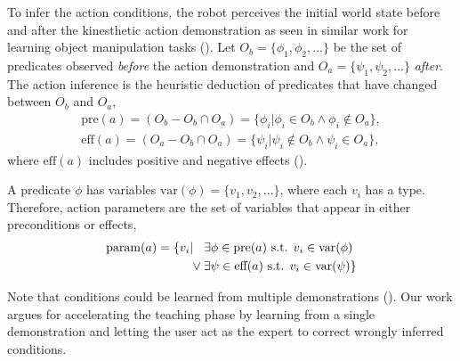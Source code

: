 To infer the action conditions, the robot perceives the initial world state   before %
and after the kinesthetic action demonstration as seen in similar work for learning object manipulation tasks (\cite{ahmadzadeh2015learning}).
Let $O_b = \{\phi_1, \phi_2, ... \}$ be the set of predicates observed \emph{before} the action demonstration and $O_a = \{\psi_1, \psi_2, ... \}$ \emph{after}.
The action inference is the heuristic deduction of predicates that have changed between $O_b$ and $O_a$, \ie
\begin{align*} \text{pre}(a) = (O_b - O_b \cap O_a) = \{\phi_i | \phi_i \in O_b \wedge \phi_i \notin O_a \}, \\
\text{eff}(a) = (O_a - O_b \cap O_a) = \{\psi_i | \psi_i \notin O_b \wedge \psi_i \in O_a \}, 
\end{align*}
where $\text{eff}(a)$ includes positive and negative effects ().

A predicate $\phi$ has variables $\text{var}(\phi) = \{v_1, v_2, \dots\}$, where each $v_i$ has a type.
Therefore, action parameters are the set of variables that appear in either preconditions or effects, \ie
\begin{align*}
     \text{param}(a) = \{v_i &| \hspace{0.3cm}\exists \phi \in \text{pre}(a) \text{ s.t. } v_i \in \text{var}(\phi)\\
     &\lor \exists \psi \in \text{eff}(a) \text{ s.t. } v_i \in \text{var}(\psi) \}
\end{align*}

Note that conditions could be learned from multiple demonstrations (\cite{abdo2013learning,konidaris2018fromSkills}).
Our work argues for accelerating the teaching phase by learning from a single demonstration and letting the user act as the expert to correct wrongly inferred conditions.

